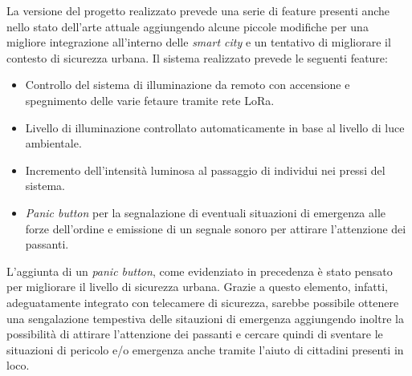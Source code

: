 \documentclass{article}
\begin{document}
	\noindent La versione del progetto realizzato prevede una serie di feature presenti anche nello stato dell'arte attuale aggiungendo alcune piccole modifiche per una migliore integrazione all'interno delle \textit{smart city} e un tentativo di migliorare il contesto di sicurezza urbana.
	Il sistema realizzato prevede le seguenti feature:
	\begin{itemize}
		\item Controllo del sistema di illuminazione da remoto con accensione e spegnimento delle varie fetaure tramite rete LoRa.
		\item Livello di illuminazione controllato automaticamente in base al livello di luce ambientale.
		\item Incremento dell'intensit\`a luminosa al passaggio di individui nei pressi del sistema.
		\item \textit{Panic button} per la segnalazione di eventuali situazioni di emergenza alle forze dell'ordine e emissione di un segnale sonoro per attirare l'attenzione dei passanti.
	\end{itemize}
	L'aggiunta di un \textit{panic button}, come evidenziato in precedenza \`e stato pensato per migliorare il livello di sicurezza urbana. Grazie a questo elemento, infatti, adeguatamente integrato con telecamere di sicurezza, sarebbe possibile ottenere
	una sengalazione tempestiva delle sitauzioni di emergenza aggiungendo inoltre la possibilit\`a di attirare l'attenzione dei
	passanti e cercare quindi di sventare le situazioni di pericolo e/o emergenza anche tramite l'aiuto di cittadini presenti in loco.
	
\end{document}
